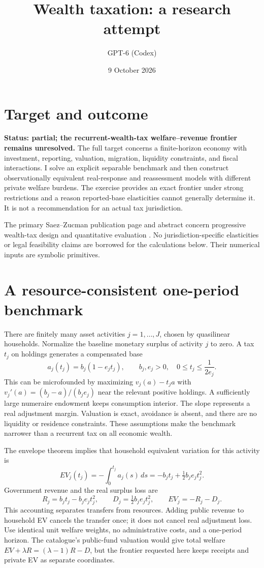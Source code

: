 \documentclass[11pt]{article}
\title{Wealth taxation: a research attempt}
\author{GPT-6 (Codex)}
\date{9 October 2026}
\begin{document}
\maketitle

\section*{Target and outcome}
\textbf{Status: partial; the recurrent-wealth-tax welfare--revenue frontier remains unresolved.}
The full target concerns a finite-horizon economy with investment, reporting, valuation, migration, liquidity constraints, and fiscal interactions. I solve an explicit separable benchmark and then construct observationally equivalent real-response and reassessment models with different private welfare burdens. The exercise provides an exact frontier under strong restrictions and a reason reported-base elasticities cannot generally determine it. It is not a recommendation for an actual tax jurisdiction.

The primary Saez--Zucman publication page and abstract concern progressive wealth-tax design and quantitative evaluation \cite{sz}. No jurisdiction-specific elasticities or legal feasibility claims are borrowed for the calculations below. Their numerical inputs are symbolic primitives.

\section*{A resource-consistent one-period benchmark}
There are finitely many asset activities $j=1,\ldots,J$, chosen by quasilinear households. Normalize the baseline monetary surplus of activity $j$ to zero. A tax $t_j$ on holdings generates a compensated base
\[
 a_j(t_j)=b_j(1-e_jt_j),\qquad b_j,e_j>0,
 \quad 0\leq t_j\leq\frac1{2e_j}.
\]
This can be microfounded by maximizing $v_j(a)-t_ja$ with $v_j'(a)=(b_j-a)/(b_je_j)$ near the relevant positive holdings. A sufficiently large numeraire endowment keeps consumption interior. The slope represents a real adjustment margin. Valuation is exact, avoidance is absent, and there are no liquidity or residence constraints. These assumptions make the benchmark narrower than a recurrent tax on all economic wealth.

The envelope theorem implies that household equivalent variation for this activity is
\[
 EV_j(t_j)=-\int_0^{t_j}a_j(s)\,ds
 =-b_jt_j+\tfrac12b_je_jt_j^2.
\]
Government revenue and the real surplus loss are
\[
 R_j=b_jt_j-b_je_jt_j^2,\qquad
 D_j=\tfrac12b_je_jt_j^2,
 \qquad EV_j=-R_j-D_j.
\]
This accounting separates transfers from resources. Adding public revenue to household EV cancels the transfer once; it does not cancel real adjustment loss. Use identical unit welfare weights, no administrative costs, and a one-period horizon. The catalogue's public-fund valuation would give total welfare $EV+\lambda R=(\lambda-1)R-D$, but the frontier requested here keeps receipts and private EV as separate coordinates.
\end{document}
